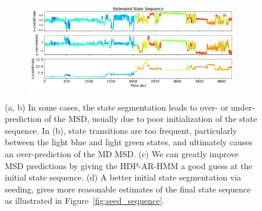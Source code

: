 \documentclass{article}
\begin{document}
\begin{figure}
\begin{subfigure}{0.35\textwidth}
  \caption{}\label{fig:msd_improvement}
  \end{subfigure}
  \begin{subfigure}{0.63\textwidth}
  \includegraphics[width=\textwidth]{state_sequence_after_ACH_21.pdf}
  \caption{}\label{fig:state_sequence_after}
  \end{subfigure}
  \caption{(a, b) In some cases, the state segmentation leads to over- or 
  under-prediction of the MSD, usually due to poor initialization of the state
  sequence. In (b), state transitions are too frequent, particularly between 
  the light blue and light green states, and ultimately causes an over-prediction
  of the MD MSD. (c) We can greatly improve MSD predictions by giving the HDP-AR-HMM a good
  guess at the initial state sequence. (d) A better initial state segmentation
  via seeding, gives more reasonable estimates of the final state sequence
  as illustrated in Figure~\ref{fig:seed_sequence}.}\label{fig:improvement_state_sequence}
  \end{figure}
\end{document}
